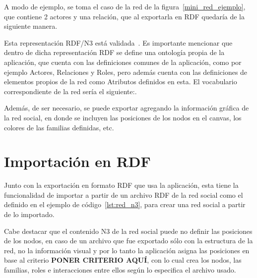 A modo de ejemplo, se toma el caso de la red de la figura~\ref{mini_red_ejemplo}, que contiene 2 actores y una relación, que al exportarla en RDF quedaría de la siguiente manera.\\


\label{lst:red_n3}

Esta representación RDF/N3 está validada~\cite{validador_rdf}. Es importante mencionar que dentro de dicha representación RDF se define una ontología propia de la aplicación, que cuenta con las definiciones comunes de la aplicación, como por ejemplo Actores, Relaciones y Roles, pero además cuenta con las definiciones de elementos propios de la red como Atributos definidos en esta. El vocabulario correspondiente de la red sería el siguiente:.


\label{lst:vocabulario_n3}

Además, de ser necesario, se puede exportar agregando la información gráfica de la red social, en donde se incluyen las posiciones de los nodos en el canvas, los colores de las familias definidas, etc.


\section{Importación en RDF} %
\label{sec:importacion_en_rdf}

Junto con la exportación en formato RDF que usa la aplicación, esta tiene la funcionalidad de importar a partir de un archivo RDF de la red social como el definido en el ejemplo de código~\ref{lst:red_n3}, para crear una red social a partir de lo importado.


Cabe destacar que el contenido N3 de la red social puede no definir las posiciones de los nodos, en caso de un archivo que fue exportado sólo con la estructura de la red, no la información visual y por lo tanto la aplicación asigna las posiciones en base al criterio \textbf{PONER CRITERIO AQUÍ}, con lo cual crea los nodos, las familias, roles e interacciones entre ellos según lo especifica el archivo usado.


% 
